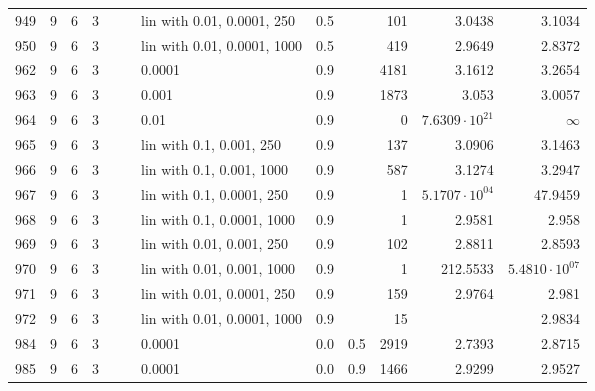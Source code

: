 \begin{longtable}{lrrrrrlrrrrr}
  949 &       9 & 6 & 3 &   &   &  lin with 0.01, 0.0001, 250 &      0.5 &        &     101 &                 3.0438 &                 3.1034 \\
  950 &       9 & 6 & 3 &   &   & lin with 0.01, 0.0001, 1000 &      0.5 &        &     419 &                 2.9649 &                 2.8372 \\
  962 &       9 & 6 & 3 &   &   &                      0.0001 &      0.9 &        &    4181 &                 3.1612 &                 3.2654 \\
  963 &       9 & 6 & 3 &   &   &                       0.001 &      0.9 &        &    1873 &                  3.053 &                 3.0057 \\
  964 &       9 & 6 & 3 &   &   &                        0.01 &      0.9 &        &       0 &  $7.6309\cdot 10^{21}$ &               $\infty$ \\
  965 &       9 & 6 & 3 &   &   &    lin with 0.1, 0.001, 250 &      0.9 &        &     137 &                 3.0906 &                 3.1463 \\
  966 &       9 & 6 & 3 &   &   &   lin with 0.1, 0.001, 1000 &      0.9 &        &     587 &                 3.1274 &                 3.2947 \\
  967 &       9 & 6 & 3 &   &   &   lin with 0.1, 0.0001, 250 &      0.9 &        &       1 &  $5.1707\cdot 10^{04}$ &                47.9459 \\
  968 &       9 & 6 & 3 &   &   &  lin with 0.1, 0.0001, 1000 &      0.9 &        &       1 &                 2.9581 &                  2.958 \\
  969 &       9 & 6 & 3 &   &   &   lin with 0.01, 0.001, 250 &      0.9 &        &     102 &                 2.8811 &                 2.8593 \\
  970 &       9 & 6 & 3 &   &   &  lin with 0.01, 0.001, 1000 &      0.9 &        &       1 &               212.5533 &  $5.4810\cdot 10^{07}$ \\
  971 &       9 & 6 & 3 &   &   &  lin with 0.01, 0.0001, 250 &      0.9 &        &     159 &                 2.9764 &                  2.981 \\
  972 &       9 & 6 & 3 &   &   & lin with 0.01, 0.0001, 1000 &      0.9 &        &      15 &                        &                 2.9834 \\
  984 &       9 & 6 & 3 &   &   &                      0.0001 &      0.0 &    0.5 &    2919 &                 2.7393 &                 2.8715 \\
  985 &       9 & 6 & 3 &   &   &                      0.0001 &      0.0 &    0.9 &    1466 &                 2.9299 &                 2.9527 \\

\end{longtable}
